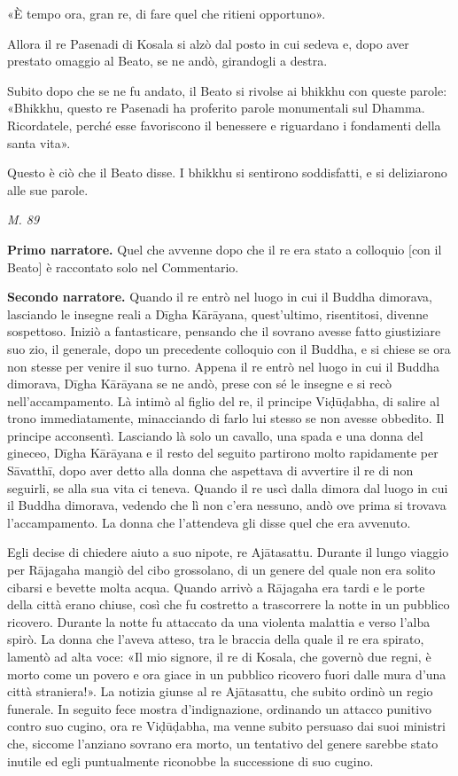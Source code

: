 «È tempo ora, gran re, di fare quel che ritieni opportuno».


Allora il re Pasenadi di Kosala si alzò dal posto in cui sedeva e, dopo
aver prestato omaggio al Beato, se ne andò, girandogli a destra.


Subito dopo che se ne fu andato, il Beato si rivolse ai bhikkhu con
queste parole: «Bhikkhu, questo re Pasenadi ha proferito parole
monumentali sul Dhamma. Ricordatele, perché esse favoriscono il
benessere e riguardano i fondamenti della santa vita».


Questo è ciò che il Beato disse. I bhikkhu si sentirono soddisfatti, e
si deliziarono alle sue parole.


\emph{M. 89}


\textbf{Primo narratore.} Quel che avvenne dopo che il re era stato a colloquio
[con il Beato] è raccontato solo nel Commentario.


\textbf{Secondo narratore.} Quando il re entrò nel luogo in cui il Buddha
dimorava, lasciando le insegne reali a Dīgha Kārāyana, quest’ultimo,
risentitosi, divenne sospettoso. Iniziò a fantasticare, pensando che il
sovrano avesse fatto giustiziare suo zio, il generale, dopo un
precedente colloquio con il Buddha, e si chiese se ora non stesse per
venire il suo turno. Appena il re entrò nel luogo in cui il Buddha
dimorava, Dīgha Kārāyana se ne andò, prese con sé le insegne e si recò
nell’accampamento. Là intimò al figlio del re, il principe Viḍūḍabha, di
salire al trono immediatamente, minacciando di farlo lui stesso se non
avesse obbedito. Il principe acconsentì. Lasciando là solo un cavallo,
una spada e una donna del gineceo, Dīgha Kārāyana e il resto del seguito
partirono molto rapidamente per Sāvatthī, dopo aver detto alla donna che
aspettava di avvertire il re di non seguirli, se alla sua vita ci
teneva. Quando il re uscì dalla dimora dal luogo in cui il Buddha
dimorava, vedendo che lì non c’era nessuno, andò ove prima si trovava
l’accampamento. La donna che l’attendeva gli disse quel che era
avvenuto.


Egli decise di chiedere aiuto a suo nipote, re Ajātasattu. Durante il
lungo viaggio per Rājagaha mangiò del cibo grossolano, di un genere
del quale non era solito cibarsi e bevette molta acqua. Quando arrivò a
Rājagaha era tardi e le porte della città erano chiuse, così che fu
costretto a trascorrere la notte in un pubblico ricovero. Durante la
notte fu attaccato da una violenta malattia e verso l’alba spirò. La
donna che l’aveva atteso, tra le braccia della quale il re era spirato,
lamentò ad alta voce: «Il mio signore, il re di Kosala, che governò due
regni, è morto come un povero e ora giace in un pubblico ricovero fuori
dalle mura d’una città straniera!». La notizia giunse al re Ajātasattu,
che subito ordinò un regio funerale. In seguito fece mostra
d’indignazione, ordinando un attacco punitivo contro suo cugino, ora re
Viḍūḍabha, ma venne subito persuaso dai suoi ministri che, siccome
l’anziano sovrano era morto, un tentativo del genere sarebbe stato
inutile ed egli puntualmente riconobbe la successione di suo cugino.


